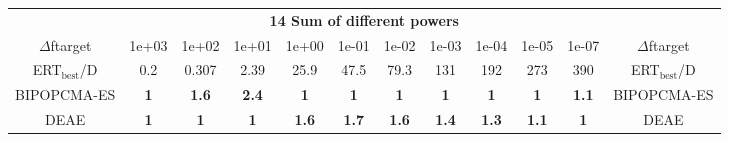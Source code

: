\begin{tabular}{cccccccccccc}
 & \multicolumn{10}{c}{{\normalsize \textbf{14 Sum of different powers}}}\\
$\Delta$ftarget& 1e+03& 1e+02& 1e+01& 1e+00& 1e-01& 1e-02& 1e-03& 1e-04& 1e-05& 1e-07 & $\Delta$ftarget \\
ERT$_{\textrm{best}}$/D& 0.2& 0.307& 2.39& 25.9& 47.5& 79.3& 131& 192& 273& 390 & ERT$_{\textrm{best}}$/D \\
\hline
BIPOPCMA-ES & \textbf{1} & \textbf{1.6} & \textbf{2.4} & \textbf{1} & \textbf{1} & \textbf{1} & \textbf{1} & \textbf{1} & \textbf{1} & \textbf{1.1} & BIPOPCMA-ES \cite{add_an_entry_for_BIPOPCMA-ES_in_bbob.bib}\\
DEAE & \textbf{1} & \textbf{1} & \textbf{1} & \textbf{1.6} & \textbf{1.7} & \textbf{1.6} & \textbf{1.4} & \textbf{1.3} & \textbf{1.1} & \textbf{1} & DEAE \cite{add_an_entry_for_DEAE_in_bbob.bib}
\end{tabular}
